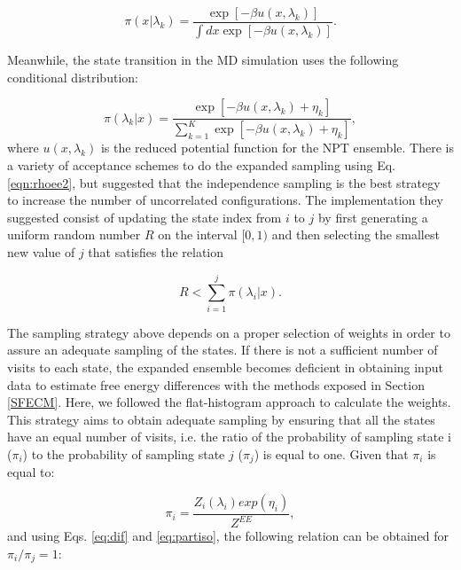     \begin{equation}
    \pi(x|\lambda_{k}) = \dfrac{\exp[-\beta u(x,\lambda_{k})]}{\int dx \exp [- \beta u(x,\lambda_{k})]}.
    \label{eqn:rhoee1}
    \end{equation} 
    
    Meanwhile, the state transition in the MD simulation uses the following conditional distribution:
    
    \begin{equation}
    \pi(\lambda_{k}|x) = \dfrac{\exp[-\beta u(x,\lambda_{k}) + \eta_{k}]}{ \sum_{k=1}^{K} \exp [- \beta u(x,\lambda_{k})+ \eta_{k}]},
    \label{eqn:rhoee2}
    \end{equation} 
    where $u(x,\lambda_{k})$ is the reduced potential function for the NPT ensemble. There is a variety of acceptance schemes to do the expanded sampling using Eq. \eqref{eqn:rhoee2}, but  suggested that the independence sampling \cite{liu2002} is the best strategy to increase the number of uncorrelated configurations. The implementation they suggested consist of updating the state index from $i$ to $j$ by first generating a uniform random number $R$ on the interval $[0,1)$ and then selecting the smallest new value of $j$ that satisfies  the relation
    
    \begin{equation}
    R < \sum_{i=1}^{j} \pi(\lambda_{i}|x) .
    \label{eqn:relee2}
    \end{equation} 
    
    The sampling strategy above depends on a proper selection of weights in order to assure an adequate sampling of the states. If there is not a sufficient number of visits to each state, the expanded ensemble becomes deficient in obtaining input data to estimate free energy differences with the methods exposed in Section \ref{SFECM}. Here, we followed the flat-histogram approach \cite{bernd1992,bernd1993,dayal2004} to calculate the weights. This strategy aims to obtain adequate sampling by ensuring that all the states have an equal number of visits, i.e. the ratio of the probability of sampling state i ($\pi_{i}$) to the probability of sampling state $j$ ($\pi_{j}$) is equal to one. Given that $\pi_{i}$ is equal to:
    
    \begin{equation}
    \pi_{i} = \dfrac{Z_{i}(\lambda_{i}) exp(\eta_{i})}{Z^{EE}} ,
    \label{eqn:wei1}
    \end{equation} 
    and using Eqs. \ref{eq:dif} and \ref {eq:partiso}, the following relation can be obtained for $\pi_{i}/\pi_{j}=1$:
    
